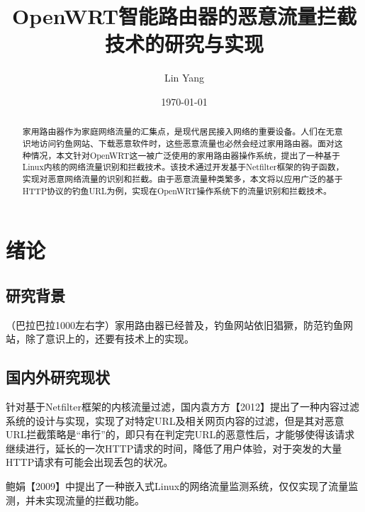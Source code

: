 \documentclass[a4paper,onecolumn,UTF8]{ctexart}
\title{OpenWRT智能路由器的恶意流量拦截技术的研究与实现}
\author{Lin Yang}
\date{\today}
\begin{document}
\tableofcontents
\maketitle
\begin{abstract}
  家用路由器作为家庭网络流量的汇集点，是现代居民接入网络的重要设备。人们在无意识地访问钓鱼网站、下载恶意软件时，这些恶意流量也必然会经过家用路由器。面对这种情况，本文针对OpenWRT这一被广泛使用的家用路由器操作系统，提出了一种基于Linux内核的网络流量识别和拦截技术。该技术通过开发基于Netfilter框架的钩子函数，实现对恶意网络流量的识别和拦截。由于恶意流量种类繁多，本文将以应用广泛的基于HTTP协议的钓鱼URL为例，实现在OpenWRT操作系统下的流量识别和拦截技术。
\end{abstract}
\section{绪论}
\subsection{研究背景}
（巴拉巴拉1000左右字）家用路由器已经普及，钓鱼网站依旧猖獗，防范钓鱼网站，除了意识上的，还要有技术上的实现。
\subsection{国内外研究现状}
针对基于Netfilter框架的内核流量过滤，国内袁方方【2012】提出了一种内容过滤系统的设计与实现，实现了对特定URL及相关网页内容的过滤，但是其对恶意URL拦截策略是“串行”的，即只有在判定完URL的恶意性后，才能够使得该请求继续进行，延长的一次HTTP请求的时间，降低了用户体验，对于突发的大量HTTP请求有可能会出现丢包的状况。
\par  鲍娟【2009】中提出了一种嵌入式Linux的网络流量监测系统，仅仅实现了流量监测，并未实现流量的拦截功能。
\end{document}
